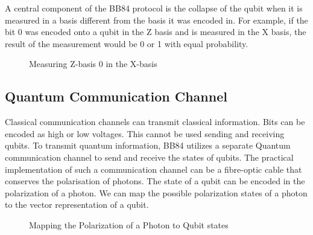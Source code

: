 \documentclass[a4paper]{article}
\begin{document}
A central component of the BB84 protocol is the collapse of the qubit when it is measured in a basis different from the basis it was encoded in. For example, if the bit 0 was encoded onto a qubit in the Z basis and is measured in the X basis, the result of the measurement would be 0 or 1 with equal probability.

\begin{figure}[h]
\centering
{}
\caption{Measuring Z-basis 0 in the X-basis}
\end{figure}

\subsection{Quantum Communication Channel} %
\label{sub:quantum communication channel}
Classical communication channels can transmit classical information. Bits can be encoded as high or low voltages. This cannot be used sending and receiving qubits. To transmit quantum information, BB84 utilizes a separate Quantum communication channel to send and receive the states of qubits. The practical implementation of such a communication channel can be a fibre-optic cable that conserves the polarisation of photons. The state of a qubit can be encoded in the polarization of a photon. We can map the possible polarization states of a photon to the vector representation of a qubit.

\begin{figure}[h]
\centering
{}
\caption{Mapping the Polarization of a Photon to Qubit states}
\end{figure}
\end{document}
